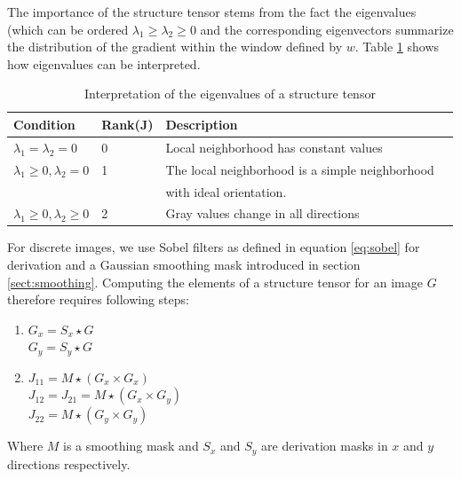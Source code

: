		The importance of the structure tensor stems from the fact the eigenvalues (which can be ordered $\lambda_1 \geq \lambda_2 \geq 0$ and the corresponding eigenvectors summarize the distribution of the gradient within the window defined by $w$. Table \ref{tab:struc_tensor_interp} shows how eigenvalues can be interpreted.
		
		\begin{table}
		
			\begin{tabular}{|l|l|l|p{5cm}| }
			\hline 
			\textbf{Condition} & \textbf{Rank(J)} & \textbf{Description }\\ 
			\hline 
			$ \lambda_1 = \lambda_2 = 0$  & 0 & Local neighborhood  has constant values\\ 
			\hline 
			$\lambda_1 \geq 0, \lambda_2 = 0 $ & 1 & The local neighborhood is a simple neighborhood \\
																				&  		& with ideal orientation.  \\ 
			\hline
			 $\lambda_1 \geq 0, \lambda_2 \geq 0 $ & 2 & Gray values change in all directions \\
			\hline
			\end{tabular} 
			
			\caption{Interpretation of the eigenvalues of a structure tensor}
			\label{tab:struc_tensor_interp}
		\end{table}
		
		
		For discrete images, we use Sobel filters as defined in equation \ref{eq:sobel} for derivation and a Gaussian smoothing mask introduced in section \ref{sect:smoothing}. Computing the elements of a structure tensor for an image $G$ therefore requires following steps:
		\begin{enumerate}
			\item $G_x = S_x \star G$ \\
						$G_y = S_y \star G$
			\item $J_{11} = M \star (G_x \times G_x)$ \\
						 $J_{12} = J_{21} = M \star (G_x \times G_y)$ \\
						 $J_{22} = M \star (G_y \times G_y)$
		\end{enumerate}
		Where $M$ is a smoothing mask and $S_x$ and $S_y$ are derivation masks in $x$ and $y$ directions respectively.

